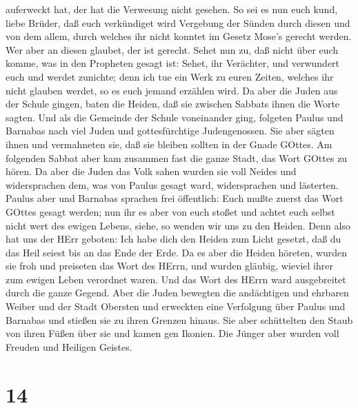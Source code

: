 auferweckt hat, der hat die Verwesung nicht gesehen.  So
sei es nun euch kund, liebe Brüder, daß euch verkündiget wird Vergebung
der Sünden durch diesen und von dem allem, durch welches ihr nicht
konntet im Gesetz Mose's gerecht werden.  Wer aber an
diesen glaubet, der ist gerecht.  Sehet nun zu, daß nicht
über euch komme, was in den Propheten gesagt ist:  Sehet,
ihr Verächter, und verwundert euch und werdet zunichte; denn ich tue ein
Werk zu euren Zeiten, welches ihr nicht glauben werdet, so es euch
jemand erzählen wird.  Da aber die Juden aus der Schule
gingen, baten die Heiden, daß sie zwischen Sabbats ihnen die Worte
sagten.  Und als die Gemeinde der Schule voneinander ging,
folgeten Paulus und Barnabas nach viel Juden und gottesfürchtige
Judengenossen. Sie aber sägten ihnen und vermahneten sie, daß sie
bleiben sollten in der Gnade GOttes.  Am folgenden Sabbat
aber kam zusammen fast die ganze Stadt, das Wort GOttes zu hören.
 Da aber die Juden das Volk sahen wurden sie voll Neides
und widersprachen dem, was von Paulus gesagt ward, widersprachen und
lästerten.  Paulus aber und Barnabas sprachen frei
öffentlich: Euch mußte zuerst das Wort GOttes gesagt werden; nun ihr es
aber von euch stoßet und achtet euch selbst nicht wert des ewigen
Lebens, siehe, so wenden wir uns zu den Heiden.  Denn also
hat uns der HErr geboten: Ich habe dich den Heiden zum Licht gesetzt,
daß du das Heil seiest bis an das Ende der Erde.  Da es
aber die Heiden höreten, wurden sie froh und preiseten das Wort des
HErrn, und wurden gläubig, wieviel ihrer zum ewigen Leben verordnet
waren.  Und das Wort des HErrn ward ausgebreitet durch die
ganze Gegend.  Aber die Juden bewegten die andächtigen und
ehrbaren Weiber und der Stadt Obersten und erweckten eine Verfolgung
über Paulus und Barnabas und stießen sie zu ihren Grenzen hinaus.
 Sie aber schüttelten den Staub von ihren Füßen über sie
und kamen gen Ikonien.  Die Jünger aber wurden voll Freuden
und Heiligen Geistes.

\hypertarget{section-13}{%
\section{14}\label{section-13}}

